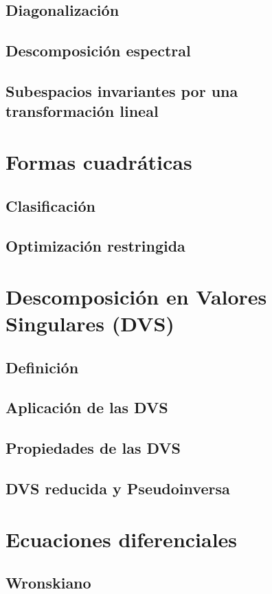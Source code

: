 \documentclass[oneside]{article}
\numberwithin{equation}{section}
\numberwithin{figure}{section}
\numberwithin{table}{section}
\begin{document}
				\subsection{Diagonalización}
				\subsection{Descomposición espectral}
				\subsection{Subespacios invariantes por una transformación lineal}
			\section{Formas cuadráticas}
				\subsection{Clasificación}
				\subsection{Optimización restringida}
			\section{Descomposición en Valores Singulares (DVS)}
				\subsection{Definición}
				\subsection{Aplicación de las DVS}
				\subsection{Propiedades de las DVS}
				\subsection{DVS reducida y Pseudoinversa}
			\section{Ecuaciones diferenciales}
				\subsection{Wronskiano}
\end{document}
